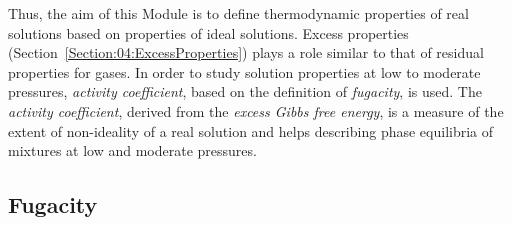 \documentclass[12pts,a4paper,amsmath,amssymb,floatfix]{article}%
\begin{document}
Thus, the aim of this Module is to define thermodynamic properties of real solutions based on properties of ideal solutions. Excess properties (Section~\ref{Section:04:ExcessProperties}) plays a role similar to that of residual properties for gases. In order to study solution properties at low to moderate pressures, {\it activity coefficient}, based on the definition of {\it fugacity}, is used. The {\it activity coefficient}, derived from the {\it excess Gibbs free energy}, is a measure of the extent of non-ideality of a real solution and helps describing phase equilibria of mixtures at low and moderate pressures.


\subsection{Fugacity}\label{Section:05:FugacitySection}
\end{document}
